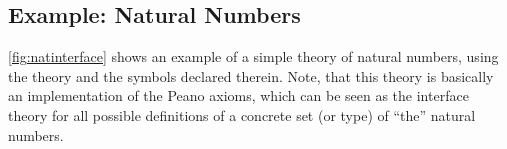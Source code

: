 %
%
%
%

\subsection{Example: Natural Numbers}

\autoref{fig:natinterface} shows an example of a simple theory of natural numbers, using the theory  and the symbols declared therein. Note, that this theory is basically an implementation of the Peano axioms, which can be seen as the interface theory for all possible definitions of a concrete set (or type) of ``the'' natural numbers.


